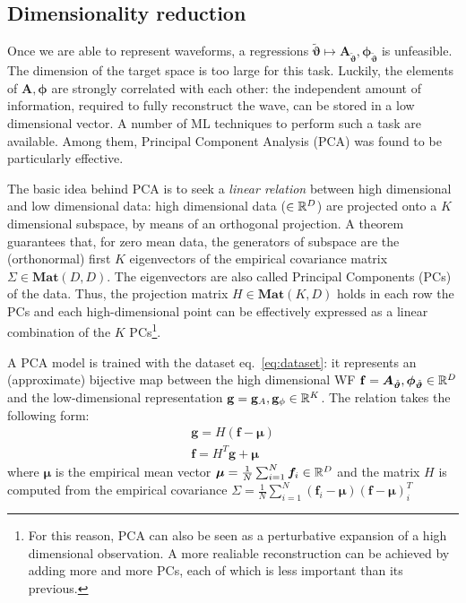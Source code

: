\subsection{Dimensionality reduction}
Once we are able to represent waveforms, a regressions ${\tilde{\boldsymbol{\vartheta}}} \longmapsto \boldsymbol{A}_{{\tilde{\boldsymbol{\vartheta}}}}, \boldsymbol{\phi}_{{\tilde{\boldsymbol{\vartheta}}}}$ is unfeasible. The dimension of the target space is too large for this task. Luckily, the elements of $\boldsymbol{A}, \boldsymbol{\phi}$ are strongly correlated with each other: the independent amount of information, required to fully reconstruct the wave, can be stored in a low dimensional vector.
A number of ML techniques to perform such a task are available. Among them, Principal Component Analysis (PCA) \cite[ch. 12]{murphy2012machine} was found to be particularly effective.
\par
The basic idea behind PCA is to seek a \textit{linear relation} between high dimensional and low dimensional data: high dimensional data ($\in \mathbb{R}^D$) are projected onto a $K$ dimensional subspace, by means of an orthogonal projection.
A theorem guarantees that, for zero mean data, the generators of subspace are the (orthonormal) first $K$ eigenvectors of the empirical covariance matrix $\Sigma \in \mathbf{Mat}(D,D)$. The eigenvectors are also called Principal Components (PCs) of the data.
Thus, the projection matrix $H\in \mathbf{Mat}(K,D)$ holds in each row the PCs and each high-dimensional point can be effectively expressed as a linear combination of the $K$ PCs\footnote{For this reason, PCA can also be seen as a perturbative expansion of a high dimensional observation. A more realiable reconstruction can be achieved by adding more and more PCs, each of which is less important than its previous.}.
\par
A PCA model is trained with the dataset eq.~\eqref{eq:dataset}: it represents an (approximate) bijective map between the high dimensional WF $\mathbf{f} = \boldsymbol{A}_{\tilde{\boldsymbol{\vartheta}}}, \boldsymbol{\phi}_{\tilde{\boldsymbol{\vartheta}}} \in \mathbb{R}^D$ and the low-dimensional representation $\mathbf{g} = \mathbf{g}_A , \mathbf{g}_\phi \in \mathbb{R}^K$.
The relation takes the following form:
\begin{align}
	\mathbf{g} = H (\mathbf{f} - \boldsymbol{\mu}) \label{eq:PCA_reduction_model}\\
	\mathbf{f} = H^T \mathbf{g} + \boldsymbol{\mu} \label{eq:PCA_reconstruction_model}
\end{align}
where $\boldsymbol{\mu}$ is the empirical mean vector ${\boldsymbol{\mu} = \frac{1}{N} \sum_{i=1}^N \boldsymbol{f}_i \in \mathbb{R}^D}$ and the matrix $H$ is computed from the empirical covariance ${\Sigma = \frac{1}{N} \sum_{i=1}^N (\mathbf{f}_i-\boldsymbol{\mu}) (\mathbf{f}-\boldsymbol{\mu})^T_i}$


